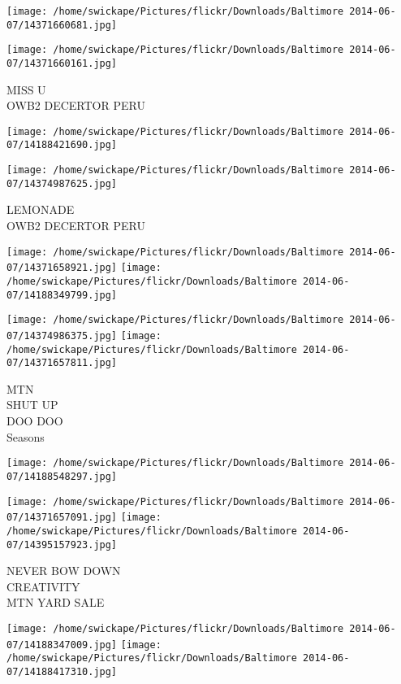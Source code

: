 \documentclass[10pt,letterpaper]{article}
\begin{document}
\texttt{[image: /home/swickape/Pictures/flickr/Downloads/Baltimore 2014-06-07/14371660681.jpg]}

\vspace{0.25in}
\texttt{[image: /home/swickape/Pictures/flickr/Downloads/Baltimore 2014-06-07/14371660161.jpg]}

MISS U\\
OWB2 DECERTOR PERU\\
\pagebreak

\texttt{[image: /home/swickape/Pictures/flickr/Downloads/Baltimore 2014-06-07/14188421690.jpg]}

\vspace{0.25in}
\texttt{[image: /home/swickape/Pictures/flickr/Downloads/Baltimore 2014-06-07/14374987625.jpg]}

LEMONADE\\
OWB2 DECERTOR PERU\\
\pagebreak

\texttt{[image: /home/swickape/Pictures/flickr/Downloads/Baltimore 2014-06-07/14371658921.jpg]}
\texttt{[image: /home/swickape/Pictures/flickr/Downloads/Baltimore 2014-06-07/14188349799.jpg]}

\texttt{[image: /home/swickape/Pictures/flickr/Downloads/Baltimore 2014-06-07/14374986375.jpg]}
\texttt{[image: /home/swickape/Pictures/flickr/Downloads/Baltimore 2014-06-07/14371657811.jpg]}

MTN\\
SHUT UP\\
DOO DOO\\
Seasons\\
\pagebreak

\texttt{[image: /home/swickape/Pictures/flickr/Downloads/Baltimore 2014-06-07/14188548297.jpg]}

\vspace{0.25in}
\texttt{[image: /home/swickape/Pictures/flickr/Downloads/Baltimore 2014-06-07/14371657091.jpg]}
\texttt{[image: /home/swickape/Pictures/flickr/Downloads/Baltimore 2014-06-07/14395157923.jpg]}

NEVER BOW DOWN\\
CREATIVITY\\
MTN YARD SALE\\
\pagebreak

\texttt{[image: /home/swickape/Pictures/flickr/Downloads/Baltimore 2014-06-07/14188347009.jpg]}
\texttt{[image: /home/swickape/Pictures/flickr/Downloads/Baltimore 2014-06-07/14188417310.jpg]}
\end{document}
